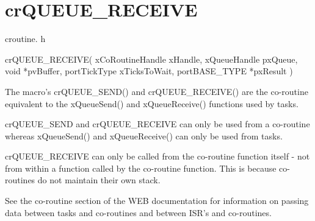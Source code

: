 \hypertarget{group__cr_q_u_e_u_e___r_e_c_e_i_v_e}{\section{cr\-Q\-U\-E\-U\-E\-\_\-\-R\-E\-C\-E\-I\-V\-E}
\label{group__cr_q_u_e_u_e___r_e_c_e_i_v_e}
}
croutine. h 
\begin{DoxyPre}
  crQUEUE\_RECEIVE(
                     xCoRoutineHandle xHandle,
                     xQueueHandle pxQueue,
                     void *pvBuffer,
                     portTickType xTicksToWait,
                     portBASE\_TYPE *pxResult
                 )\end{DoxyPre}


The macro's cr\-Q\-U\-E\-U\-E\-\_\-\-S\-E\-N\-D() and cr\-Q\-U\-E\-U\-E\-\_\-\-R\-E\-C\-E\-I\-V\-E() are the co-\/routine equivalent to the x\-Queue\-Send() and x\-Queue\-Receive() functions used by tasks.

cr\-Q\-U\-E\-U\-E\-\_\-\-S\-E\-N\-D and cr\-Q\-U\-E\-U\-E\-\_\-\-R\-E\-C\-E\-I\-V\-E can only be used from a co-\/routine whereas x\-Queue\-Send() and x\-Queue\-Receive() can only be used from tasks.

cr\-Q\-U\-E\-U\-E\-\_\-\-R\-E\-C\-E\-I\-V\-E can only be called from the co-\/routine function itself -\/ not from within a function called by the co-\/routine function. This is because co-\/routines do not maintain their own stack.

See the co-\/routine section of the W\-E\-B documentation for information on passing data between tasks and co-\/routines and between I\-S\-R's and co-\/routines.


